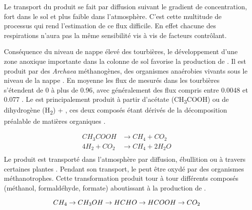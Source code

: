 Le transport du \coo produit se fait par diffusion suivant le gradient de concentration, fort dans le sol et plus faible dans l'atmosphère.
C'est cette multitude de processus qui rend l'estimation de ce flux difficile.
En effet chacune des respirations n'aura pas la même sensibilité vis à vis de facteurs contrôlant.




Conséquence du niveau de nappe élevé des tourbières, le développement d'une zone anoxique importante dans la colonne de sol favorise la production de \chh.
Il est produit par des \textit{Archaea} méthanogènes, des organismes anaérobies vivants sous le niveau de la nappe \citep{garcia2000}.
En moyenne les flux de \chh mesurés dans les tourbières s'étendent de 0 à plus de \SI{0.96}{\uml}, avec généralement des flux compris entre \num{0.0048} et \SI{0.077}{\uml} \citep{blodau2002}.
Le \chh est principalement produit à partir d'acétate (CH\textsubscript{3}COOH) ou de dihydrogène (H\textsubscript{2}) + \coo, ces deux composés étant dérivés de la décomposition préalable de matières organiques \citep{lai2009}.

$$\begin{aligned}
CH_{3}COOH  &\rightarrow CH_{4} + CO_{2}\\
4H_{2} + CO_{2} &\rightarrow CH_{4} + 2H_{2}O\\
\end{aligned} $$
Le \chh produit est transporté dans l'atmosphère par diffusion, ébullition ou à travers certaines plantes \citep{joabsson1999,colmer2003}.
Pendant son transport, le \chh peut être oxydé par des organismes méthanotrophes.
Cette transformation produit tour à tour différents composés (méthanol, formaldéhyde, formate) aboutissant à la production de \coo \citep{whalen2005}.

$$
CH_{4} \rightarrow CH_{3}OH \rightarrow HCHO \rightarrow HCOOH \rightarrow CO_{2} \\
$$

